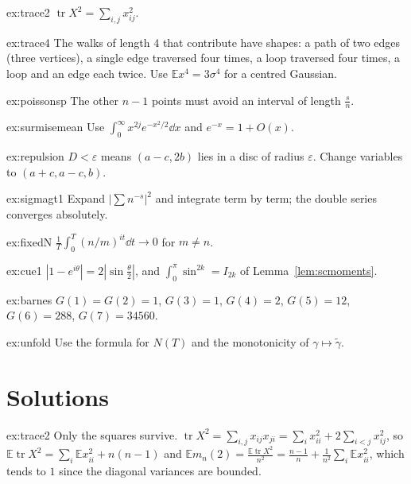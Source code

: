 \begin{hint}{ex:trace2}
$\operatorname{tr}X^2=\sum_{i,j}x_{ij}^2$.
\end{hint}
\begin{hint}{ex:trace4}
The walks of length $4$ that contribute have shapes: a path of two edges (three vertices), a single edge traversed four times, a loop traversed four times, a loop and an edge each twice.
Use $\mathbb Ex^4=3\sigma^4$ for a centred Gaussian.
\end{hint}
\begin{hint}{ex:poissonsp}
The other $n-1$ points must avoid an interval of length $\frac sn$.
\end{hint}
\begin{hint}{ex:surmisemean}
Use $\int_0^\infty x^{2j}e^{-x^2/2}\dd x$ and $e^{-x}=1+O(x)$.
\end{hint}
\begin{hint}{ex:repulsion}
$D<\varepsilon$ means $(a-c,2b)$ lies in a disc of radius $\varepsilon$. Change variables to $(a+c,a-c,b)$.
\end{hint}
\begin{hint}{ex:sigmagt1}
Expand $|\sum n^{-s}|^2$ and integrate term by term; the double series converges absolutely.
\end{hint}
\begin{hint}{ex:fixedN}
$\frac1T\int_0^T(n/m)^{it}\dd t\to0$ for $m\ne n$.
\end{hint}
\begin{hint}{ex:cue1}
$|1-e^{i\theta}|=2|\sin\frac\theta2|$, and $\int_0^\pi\sin^{2k}=I_{2k}$ of Lemma~\ref{lem:scmoments}.
\end{hint}
\begin{hint}{ex:barnes}
$G(1)=G(2)=1$, $G(3)=1$, $G(4)=2$, $G(5)=12$, $G(6)=288$, $G(7)=34560$.
\end{hint}
\begin{hint}{ex:unfold}
Use the formula for $N(T)$ and the monotonicity of $\gamma\mapsto\tilde\gamma$.
\end{hint}

\section{Solutions}

\begin{solution}{ex:trace2}
\idea Only the squares survive.
\writeup $\operatorname{tr}X^2=\sum_{i,j}x_{ij}x_{ji}=\sum_ix_{ii}^2+2\sum_{i<j}x_{ij}^2$, so $\mathbb E\operatorname{tr}X^2=\sum_i\mathbb Ex_{ii}^2+n(n-1)$ and
$\mathbb Em_n(2)=\frac{\mathbb E\operatorname{tr}X^2}{n^2}=\frac{n-1}n+\frac1{n^2}\sum_i\mathbb Ex_{ii}^2$, which tends to $1$ since the diagonal variances are bounded.
\end{solution}

